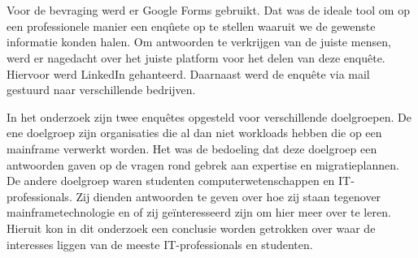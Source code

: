 \section{}
\label{sec:De bevraging}

Voor de bevraging werd er Google Forms gebruikt. Dat was de ideale tool om op een professionele manier een enqûete op te stellen waaruit we de gewenste informatie konden halen. Om antwoorden te verkrijgen van de juiste mensen, werd er nagedacht over het juiste platform voor het delen van deze enquête. Hiervoor werd LinkedIn gehanteerd. Daarnaast werd de enquête via mail gestuurd naar verschillende bedrijven. 

In het onderzoek zijn twee enquêtes opgesteld voor verschillende doelgroepen. De ene doelgroep zijn organisaties die al dan niet workloads hebben die op een mainframe verwerkt worden. Het was de bedoeling dat deze doelgroep een antwoorden gaven op de vragen rond gebrek aan expertise en migratieplannen. De andere doelgroep waren studenten computerwetenschappen en IT-professionals. Zij dienden antwoorden te geven over hoe zij staan tegenover mainframetechnologie en of zij geïnteresseerd zijn om hier meer over te leren. Hieruit kon in dit onderzoek een conclusie worden getrokken over waar de interesses liggen van de meeste IT-professionals en studenten.

